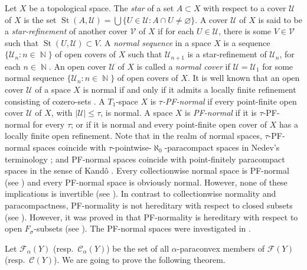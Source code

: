 \documentclass[12pt,a4paper,fleqn,leqno]{amsart}
\theoremstyle{plain}
\theoremstyle{definition}
\numberwithin{equation}{section}
\begin{document}
Let $X$ be a topological space. The \emph{star} of a set $A\subset X$ with respect to a cover $\mathscr{U}$ of $X$ is the set $\operatorname{St}(A,\mathscr{U})=\bigcup\{U\in\mathscr{U}:A\cap U \neq{\varnothing}\}$. A cover $\mathscr{U}$ of $X$ is said to be a \emph{star-refinement} of
another cover $\mathscr{V}$ of $X$ if for each $U\in\mathscr{U}$, there is some $V\in\mathscr{V}$ such that $\operatorname{St}(U,\mathscr{U})\subset V$. A \emph{normal sequence} in a space $X$ is a sequence $\{\mathscr{U}_n:n\in\operatorname{\mathbb{N}}\}$ of open covers of $X$ such that $\mathscr{U}_{n+1}$ is a star-refinement of $\mathscr{U}_n$, for each $n\in\operatorname{\mathbb{N}}$. An open cover $\mathscr{U}$ of $X$ is called a \emph{normal cover} if $\mathscr{U}=\mathscr{U}_1$ for some normal sequence $\{\mathscr{U}_n:n\in\operatorname{\mathbb{N}}\}$ of open covers of $X$. It is well known that an open cover $\mathscr{U}$ of a space $X$ is normal if and only if it admits a locally finite refinement consisting of cozero-sets \cite{morita}. A $T_1$-space $X$ is \emph{$\tau$-PF-normal} if every point-finite open cover $\mathscr{U}$ of $X$, with $|\mathscr{U}|\leq\tau$, is normal. A space $X$ is \emph{PF-normal} if it is $\tau$-PF-normal for every $\tau$; or if it is normal and every point-finite open cover of $X$ has a locally finite open refinement. Note that in the realm of normal spaces, $\tau$-PF-normal spaces coincide with $\tau$-pointwise-$\aleph_0$-paracompact spaces in Nedev's terminology \cite{nedev}; and PF-normal spaces coincide with point-finitely paracompact spaces in the sense of Kand\^{o} \cite{kando}. Every collectionwise normal
space is PF-normal (see \cite[Theorem 2]{michael4}) and every PF-normal space is obviously normal. However, none of these implications is invertible (see \cite[Examples 1 and 2]{michael4}). In contrast to collectionwise normality and paracompactness, PF-normality is not hereditary with respect to closed subsets (see \cite[p. 506, \S 4]{gutev-al}).
However, it was proved in \cite{yamauchi} that PF-normality is hereditary with respect to open $F_{\sigma}$-subsets (see \cite[Proposition 4.5]{yamauchi}). The PF-normal spaces were investigated in \cite{gutev-al,kando,michael4,smith}.\medskip

Let $\mathscr{F}_{\alpha}(Y)$ (resp.\ $\mathscr{C}_{\alpha}(Y)$) be the set of all $\alpha$-paraconvex members of $\mathscr{F}(Y)$ (resp.\ $\mathscr{C}(Y)$). We are going to prove the following theorem.
\end{document}
